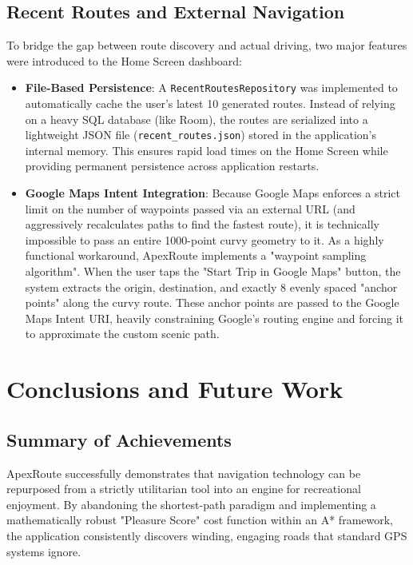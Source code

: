 \documentclass[12pt,a4paper,oneside]{report}
\begin{document}
\section{Recent Routes and External Navigation}
To bridge the gap between route discovery and actual driving, two major features were introduced to the Home Screen dashboard:
\begin{itemize}
    \item \textbf{File-Based Persistence}: A \texttt{RecentRoutesRepository} was implemented to automatically cache the user's latest 10 generated routes. Instead of relying on a heavy SQL database (like Room), the routes are serialized into a lightweight JSON file (\texttt{recent\_routes.json}) stored in the application's internal memory. This ensures rapid load times on the Home Screen while providing permanent persistence across application restarts.
    \item \textbf{Google Maps Intent Integration}: Because Google Maps enforces a strict limit on the number of waypoints passed via an external URL (and aggressively recalculates paths to find the fastest route), it is technically impossible to pass an entire 1000-point curvy geometry to it. As a highly functional workaround, ApexRoute implements a "waypoint sampling algorithm". When the user taps the "Start Trip in Google Maps" button, the system extracts the origin, destination, and exactly 8 evenly spaced "anchor points" along the curvy route. These anchor points are passed to the Google Maps Intent URI, heavily constraining Google's routing engine and forcing it to approximate the custom scenic path.
\end{itemize}

\chapter{Conclusions and Future Work}

\section{Summary of Achievements}
ApexRoute successfully demonstrates that navigation technology can be repurposed from a strictly utilitarian tool into an engine for recreational enjoyment. By abandoning the shortest-path paradigm and implementing a mathematically robust "Pleasure Score" cost function within an A* framework, the application consistently discovers winding, engaging roads that standard GPS systems ignore.
\end{document}
